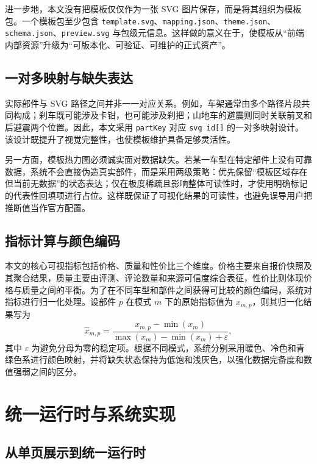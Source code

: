 \documentclass[12pt,hyperref,a4paper,UTF8]{ctexart}
\begin{document}
进一步地，本文没有把模板仅仅作为一张 SVG 图片保存，而是将其组织为模板包。一个模板包至少包含 \texttt{template.svg}、\texttt{mapping.json}、\texttt{theme.json}、\texttt{schema.json}、\texttt{preview.svg} 与包级元信息。这样做的意义在于，使模板从“前端内部资源”升级为“可版本化、可验证、可维护的正式资产”。

\subsection{一对多映射与缺失表达}

实际部件与 SVG 路径之间并非一一对应关系。例如，车架通常由多个路径片段共同构成；刹车既可能涉及卡钳，也可能涉及刹把；山地车的避震则同时关联前叉和后避震两个位置。因此，本文采用 \texttt{partKey} 对应 \texttt{svg id[]} 的一对多映射设计。该设计既提升了视觉完整性，也使模板维护具备足够灵活性。

另一方面，模板热力图必须诚实面对数据缺失。若某一车型在特定部件上没有可靠数据，系统不会直接伪造真实部件，而是采用两级策略：优先保留“模板区域存在但当前无数据”的状态表达；仅在极度稀疏且影响整体可读性时，才使用明确标记的代表性回填项进行占位。这样既保证了可视化结果的可读性，也避免误导用户把推断值当作官方配置。

\subsection{指标计算与颜色编码}

本文的核心可视指标包括价格、质量和性价比三个维度。价格主要来自报价快照及其聚合结果，质量主要由评测、评论数量和来源可信度综合表征，性价比则体现价格与质量之间的平衡。为了在不同车型和部件之间获得可比较的颜色编码，系统对指标进行归一化处理。设部件 $p$ 在模式 $m$ 下的原始指标值为 $x_{m,p}$，则其归一化结果写为
\begin{equation}
\hat{x}_{m,p} = \frac{x_{m,p} - \min(x_m)}{\max(x_m) - \min(x_m) + \varepsilon},
\label{eq:norm}
\end{equation}
其中 $\varepsilon$ 为避免分母为零的稳定项。根据不同模式，系统分别采用暖色、冷色和青绿色系进行颜色映射，并将缺失状态保持为低饱和浅灰色，以强化数据完备度和数值强弱之间的区分。

\section{统一运行时与系统实现}

\subsection{从单页展示到统一运行时}
\end{document}
